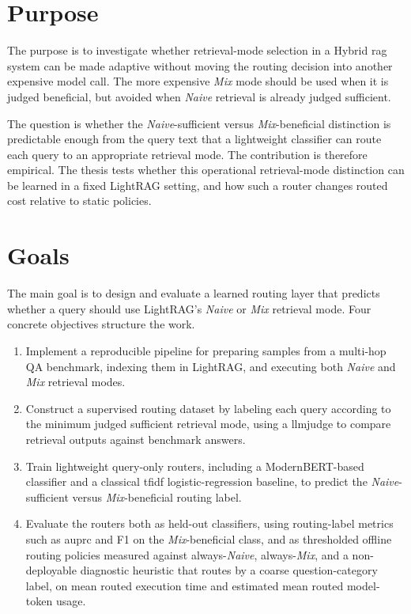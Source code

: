 \documentclass[english, bibtex]{kththesis}               %
\numberwithin{listing}{chapter}
\begin{document}
\section{Purpose}
\label{sec:purpose}
The purpose is to investigate whether retrieval-mode selection in a Hybrid \gls{rag} system can be made adaptive without moving the routing decision into another expensive model call. The more expensive \emph{Mix} mode should be used when it is judged beneficial, but avoided when \emph{Naive} retrieval is already judged sufficient.

The question is whether the \emph{Naive}-sufficient versus \emph{Mix}-beneficial distinction is predictable enough from the query text that a lightweight classifier can route each query to an appropriate retrieval mode. The contribution is therefore empirical. The thesis tests whether this operational retrieval-mode distinction can be learned in a fixed LightRAG setting, and how such a router changes routed cost relative to static policies.



\section{Goals}
\label{sec:goals}
The main goal is to design and evaluate a learned routing layer that predicts whether a query should use LightRAG's \emph{Naive} or \emph{Mix} retrieval mode. Four concrete objectives structure the work.

\begin{enumerate}
\item Implement a reproducible pipeline for preparing samples from a multi-hop QA benchmark, indexing them in LightRAG, and executing both \emph{Naive} and \emph{Mix} retrieval modes.
\item Construct a supervised routing dataset by labeling each query according to the minimum judged sufficient retrieval mode, using a \gls{llmjudge} to compare retrieval outputs against benchmark answers.
\item Train lightweight query-only routers, including a ModernBERT-based classifier and a classical \gls{tfidf} logistic-regression baseline, to predict the \emph{Naive}-sufficient versus \emph{Mix}-beneficial routing label.
\item Evaluate the routers both as held-out classifiers, using routing-label metrics such as \gls{auprc} and F1 on the \emph{Mix}-beneficial class, and as thresholded offline routing policies measured against always-\emph{Naive}, always-\emph{Mix}, and a non-deployable diagnostic heuristic that routes by a coarse question-category label, on mean routed execution time and estimated mean routed model-token usage.
\end{enumerate}
\end{document}
